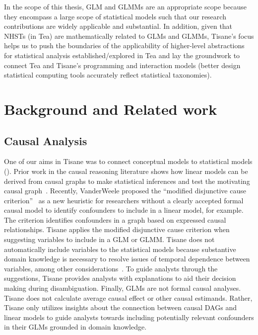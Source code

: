 In the scope of this thesis, GLM and GLMMs are an appropriate scope because they
encompass a large scope of statistical models such that our research
contributions are widely applicable and substantial. In addition, given that
NHSTs (in Tea) are mathematically related to GLMs and GLMMs, Tisane's focus
helps us to push the boundaries of the applicability of higher-level
abstractions for statistical analysis established/explored in Tea and lay the
groundwork to connect Tea and Tisane's programming and interaction models
(better design statistical computing tools accurately reflect statistical
taxonomies).

\section{Background and Related work}
\subsection{Causal Analysis}
One of our aims in Tisane was to connect conceptual models to statistical models
(\connectConceptualStats). Prior work in the causal reasoning literature shows
how linear models can be derived from causal graphs to make statistical
inferences and test the motivating causal
graph~\cite{spirtes1996using,spirtes1994conditional}. Recently, VanderWeele
proposed the ``modified disjunctive cause
criterion''~\cite{vanderweele2019modifiedDisjunctiveCriterion} as a new
heuristic for researchers without a clearly accepted formal causal model to
identify confounders to include in a linear model, for example. The criterion
identifies confounders in a graph based on expressed causal relationships.
Tisane applies the modified disjunctive cause criterion when suggesting
variables to include in a GLM or GLMM. Tisane does not automatically include
variables to the statistical models because substantive domain knowledge is
necessary to resolve issues of temporal dependence between variables, among
other considerations~\cite{vanderweele2019modifiedDisjunctiveCriterion}. To
guide analysts through the suggestions, Tisane provides analysts with
explanations to aid their decision making during disambiguation. Finally, GLMs
are not formal causal analyses. Tisane does not calculate average causal effect
or other causal estimands. Rather, Tisane only utilizes insights about the
connection between causal DAGs and linear models to guide analysts towards
including potentially relevant confounders in their GLMs grounded in domain
knowledge. 

